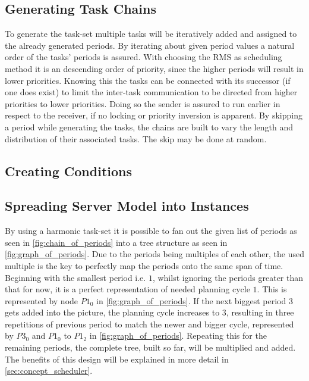 \subsection{Generating Task Chains}\label{sec:generating_task_chains}
To generate the task-set multiple tasks will be iteratively added and assigned to the already generated periods.
By iterating about given period values a natural order of the tasks' periods is assured.
With choosing the \ac{RMS} as scheduling method it is an descending order of priority, since the higher periods will result in lower priorities.
Knowing this the tasks can be connected with its successor (if one does exist) to limit the inter-task communication to be directed from higher priorities to lower priorities.
Doing so the sender is assured to run earlier in respect to the receiver, if no locking or priority inversion is apparent. 
By skipping a period while generating the tasks, the chains are built to vary the length and distribution of their associated tasks.
The skip may be done at random. 

\subsection{Creating Conditions}\label{sec:creating_conditions}

\subsection{Spreading Server Model into Instances}\label{sec:spreading_server_model_into_instances}
By using a harmonic task-set it is possible to fan out the given list of periods as seen in \cref{fig:chain_of_periods} into a tree structure as seen in \cref{fig:graph_of_periods}.
Due to the periods being multiples of each other, the used multiple is the key to perfectly map the periods onto the same span of time.
Beginning with the smallest period i.e. $1$, whilst ignoring the periods greater than that for now, it is a perfect representation of needed planning cycle $1$.
This is represented by node $P1_0$ in \cref{fig:graph_of_periods}.
If the next biggest period $3$ gets added into the picture, the planning cycle increases to $3$, resulting in three repetitions of previous period to match the newer and bigger cycle, represented by $P3_0$ and $P1_0$ to $P1_2$ in \cref{fig:graph_of_periods}.
Repeating this for the remaining periods, the complete tree, built so far, will be multiplied and added.
The benefits of this design will be explained in more detail in \cref{sec:concept_scheduler}.

